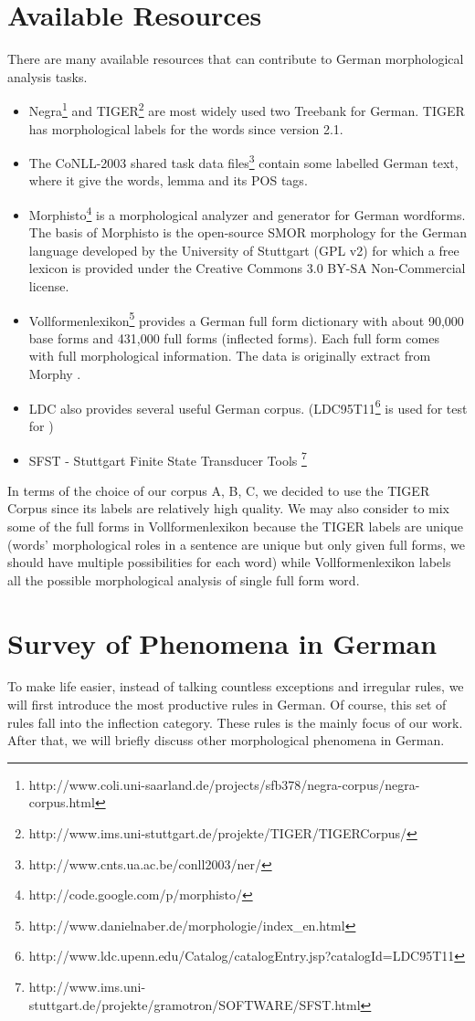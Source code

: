\documentclass[11pt,letterpaper]{article}
\begin{document}
\section{Available Resources}
There are many available resources that can contribute to German morphological analysis tasks. 
\begin{itemize}
\item Negra\footnote{http://www.coli.uni-saarland.de/projects/sfb378/negra-corpus/negra-corpus.html} and TIGER\footnote{http://www.ims.uni-stuttgart.de/projekte/TIGER/TIGERCorpus/} are most widely used two Treebank for German. TIGER has morphological labels for the words since version 2.1.  
\item The CoNLL-2003 shared task data files\footnote{http://www.cnts.ua.ac.be/conll2003/ner/} contain some labelled German text, where it give the words, lemma and its POS tags.
\item Morphisto\footnote{http://code.google.com/p/morphisto/} is a morphological analyzer and generator for German wordforms. The basis of Morphisto is the open-source SMOR morphology for the German language developed by the University of Stuttgart (GPL v2) for which a free lexicon is provided under the Creative Commons 3.0 BY-SA Non-Commercial license.
\item Vollformenlexikon\footnote{http://www.danielnaber.de/morphologie/index\_en.html} provides a German full form dictionary with about 90,000 base forms and 431,000 full forms (inflected forms). Each full form comes with full morphological information. The data is originally extract from Morphy \citep{lez96}.
\item LDC also provides several useful German corpus. (LDC95T11\footnote{http://www.ldc.upenn.edu/Catalog/catalogEntry.jsp?catalogId=LDC95T11} is used for test for \cite{sch04})
\item SFST - Stuttgart Finite State Transducer Tools \footnote{http://www.ims.uni-stuttgart.de/projekte/gramotron/SOFTWARE/SFST.html}
\end{itemize}
In terms of the choice of our corpus A, B, C, we decided to use the TIGER Corpus since its labels are relatively high quality. We may also consider to mix some of the full forms in Vollformenlexikon because the TIGER labels are unique (words' morphological roles in a sentence are unique but only given full forms, we should have multiple possibilities for each word) while Vollformenlexikon labels all the possible morphological analysis of single full form word.

\section{Survey of Phenomena in German}
To make life easier, instead of talking countless exceptions and irregular rules, we will first introduce the most productive rules in German. Of course, this set of rules fall into the inflection category. These rules is the mainly focus of our work. After that, we will briefly discuss other morphological phenomena in German.
\end{document}
